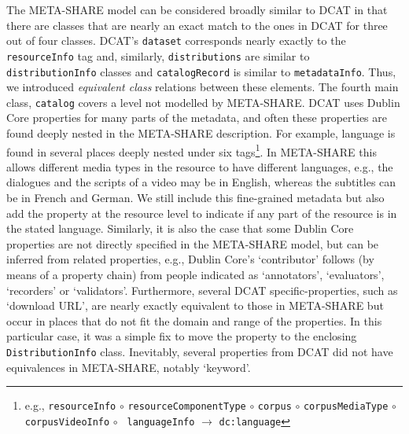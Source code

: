 \documentclass{llncs}
\begin{document}
\label{sec:dcat}
The META-SHARE model can be considered broadly similar to DCAT in that there are
classes that are nearly an exact match to the ones in DCAT for three out of four
classes. DCAT's {\tt dataset} corresponds nearly exactly to the {\tt resourceInfo} tag and, similarly, {\tt distributions} are similar to {\tt distributionInfo} 
classes and {\tt catalogRecord} is similar to {\tt metadataInfo}. Thus, we
introduced \emph{equivalent class} relations between these elements. The
fourth main class, {\tt catalog} covers a level not modelled by META-SHARE.
DCAT uses Dublin Core properties for many parts of the metadata, and often these
properties are found deeply nested in the META-SHARE description. For example, language
is found in several places deeply nested under six
tags\footnote{e.g., {\tt resourceInfo} $\circ$ {\tt resourceComponentType}
    $\circ$ {\tt corpus} $\circ$ {\tt corpusMediaType} $\circ$ {\tt corpusVideoInfo}
    $\circ$ {\tt
languageInfo} $\rightarrow$ {\tt dc:language}}. In META-SHARE this allows different media types in the resource
to have different languages, e.g., the dialogues and the scripts of a video may
be in English, whereas the subtitles can be in French and German.
We still include this fine-grained metadata but also add the property at the resource level
to indicate if any part of the resource is in the stated language.
Similarly, it is also the case that some Dublin Core properties are not directly
specified in the META-SHARE model, but can be inferred from related properties,
e.g., Dublin Core's `contributor' follows (by means of a property chain) from people indicated as `annotators',
`evaluators', `recorders' or `validators'. Furthermore, several DCAT specific-properties, such as `download URL', are nearly
exactly equivalent to those in META-SHARE but occur in places that do not fit the
domain and range of the properties. In this particular case, it was a simple fix
to move the property to the enclosing {\tt DistributionInfo} class.
Inevitably, several properties from DCAT did not have equivalences in
META-SHARE, notably `keyword'.
\end{document}

